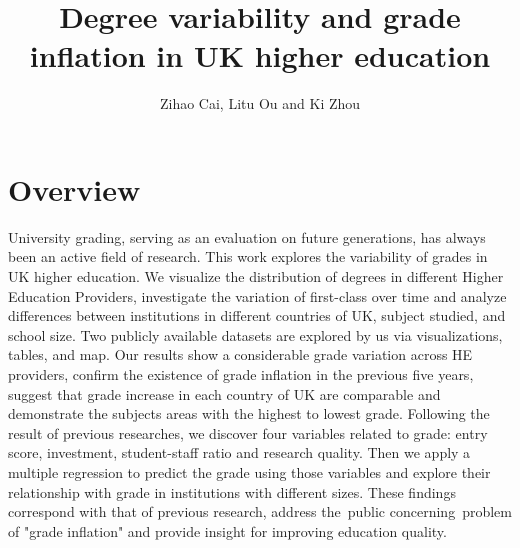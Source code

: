 \documentclass[11pt,a4paper]{article}
\title{Degree variability and grade inflation in UK higher education}
\author{Zihao Cai, Litu Ou and Ki Zhou}
\begin{document}
\maketitle


\section{Overview}

University grading, serving as an evaluation on future generations, has always been an active field of research. This work explores the variability of grades in UK higher education. We visualize the distribution of degrees in different Higher Education Providers, investigate the variation of first-class over time and analyze differences between institutions in different countries of UK, subject studied, and school size. Two publicly available datasets are explored by us via visualizations, tables, and map. Our results show a considerable grade variation across HE providers, confirm the existence of grade inflation in the previous five years, suggest that grade increase in each country of UK are comparable and demonstrate the subjects areas with the highest to lowest grade. Following the result of previous researches, we discover four variables related to grade: entry score, investment, student-staff ratio and research quality. Then we apply a multiple regression to predict the grade using those variables and explore their relationship with grade in institutions with different sizes. These findings correspond with that of previous research, address the public concerning problem of "grade inflation" and provide insight for improving education quality. 
\end{document}
